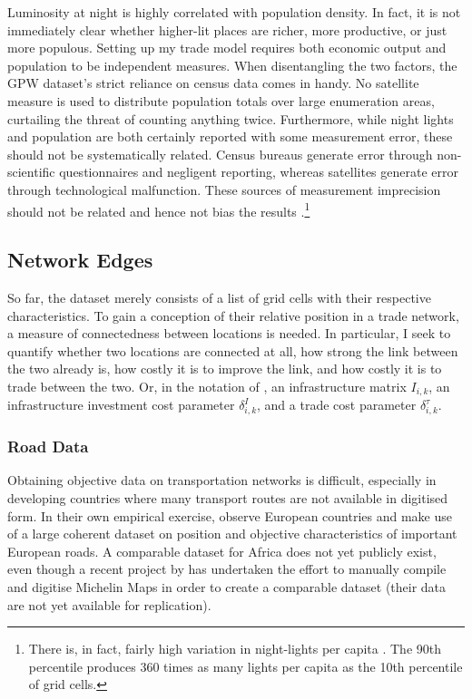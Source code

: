 \documentclass[11pt, oneside]{article}   	%
\begin{document}
Luminosity at night is highly correlated with population density. In fact, it is not immediately clear whether higher-lit places are richer, more productive, or just more populous. Setting up my trade model requires both economic output and population to be independent measures. When disentangling the two factors, the GPW dataset's strict reliance on census data comes in handy. No satellite measure is used to distribute population totals over large enumeration areas, curtailing the threat of counting anything twice. Furthermore, while night lights and population are both certainly reported with some measurement error, these should not be systematically related. Census bureaus generate error through non-scientific questionnaires and negligent reporting, whereas satellites generate error through technological malfunction. These sources of measurement imprecision should not be related and hence not bias the results \citep[see also][]{Pinkovskiy_LightsCameraIncome_2016}.\footnote{There is, in fact, fairly high variation in night-lights per capita \citep[a measure which should be employed with scientific caution and is only reported here for illustrative purposes, see][]{Michalopoulos_SpatialPatternsDevelopment_2018}. The 90th percentile produces 360 times as many lights per capita as the 10th percentile of grid cells.}

\subsection{Network Edges}
So far, the dataset merely consists of a list of grid cells with their respective characteristics. To gain a conception of their relative position in a trade network, a measure of connectedness between locations is needed. In particular, I seek to quantify whether two locations are connected at all, how strong the link between the two already is, how costly it is to improve the link, and how costly it is to trade between the two. Or, in the notation of \cite{Fajgelbaum_OptimalTransportNetworks_2017}, an infrastructure matrix $I_{i,k}$, an infrastructure investment cost parameter $\delta_{i,k}^{I}$, and a trade cost parameter $\delta_{i,k}^{\tau}$.

\subsubsection{Road Data}
\label{sec:road_data}
Obtaining objective data on transportation networks is difficult, especially in developing countries where many transport routes are not available in digitised form. In their own empirical exercise, \citeauthor{Fajgelbaum_OptimalTransportNetworks_2017} observe European countries and make use of a large coherent dataset on position and objective characteristics of important European roads. A comparable dataset for Africa does not yet publicly exist, even though a recent project by \cite{Jedwab_AverageHeterogeneousEffects_2017} has undertaken the effort to manually compile and digitise Michelin Maps in order to create a comparable dataset (their data are not yet available for replication).
\end{document}
